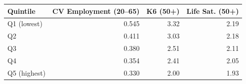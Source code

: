 \begin{tabular}{lrrr}
\toprule
\textbf{Quintile} & \textbf{CV Employment (20--65)} & \textbf{K6 (50+)} & \textbf{Life Sat. (50+)} \\
\midrule
Q1 (lowest) & 0.545 & 3.32 & 2.19 \\
Q2 & 0.411 & 3.03 & 2.18 \\
Q3 & 0.380 & 2.51 & 2.11 \\
Q4 & 0.354 & 2.41 & 2.05 \\
Q5 (highest) & 0.330 & 2.00 & 1.93 \\
\bottomrule
\end{tabular}

